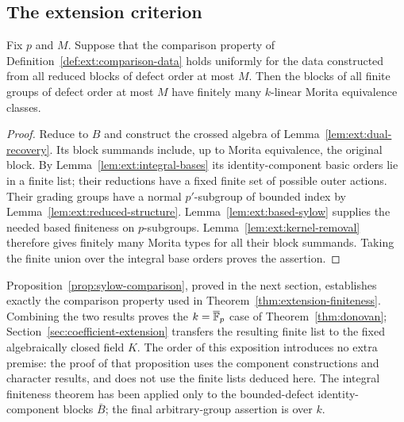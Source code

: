\subsection{The extension criterion}

\begin{theorem}
\label{thm:extension-finiteness}
Fix $p$ and $M$.  Suppose that the comparison property of
Definition~\ref{def:ext:comparison-data} holds uniformly for the
data constructed from all reduced blocks of defect order at most
$M$.  Then the blocks of all finite groups of defect order at
most $M$ have finitely many $k$-linear Morita equivalence classes.
\end{theorem}

\begin{proof}
Reduce to $B$ and construct the crossed algebra of
Lemma~\ref{lem:ext:dual-recovery}.  Its block summands include,
up to Morita equivalence, the original block.  By
Lemma~\ref{lem:ext:integral-bases} its identity-component basic
orders lie in a finite list; their reductions have a fixed finite
set of possible outer actions.  Their grading groups have a
normal $p'$-subgroup of bounded index by
Lemma~\ref{lem:ext:reduced-structure}.  Lemma~\ref{lem:ext:based-sylow}
supplies the needed based finiteness on $p$-subgroups.
Lemma~\ref{lem:ext:kernel-removal} therefore gives finitely many
Morita types for all their block summands.  Taking the finite union
over the integral base orders proves the assertion.
\end{proof}

Proposition~\ref{prop:sylow-comparison}, proved in the next section,
establishes exactly the comparison property used in
Theorem~\ref{thm:extension-finiteness}.  Combining the two results
proves the $k=\overline{\mathbb F}_p$ case of Theorem~\ref{thm:donovan};
Section~\ref{sec:coefficient-extension} transfers the resulting finite
list to the fixed algebraically closed field $K$.  The order of this exposition
introduces no extra premise: the proof of that proposition uses
the component constructions and character results, and does not
use the finite lists deduced here.  The integral finiteness theorem
has been applied only to the bounded-defect identity-component
blocks $\bar B$; the final arbitrary-group assertion is over $k$.
